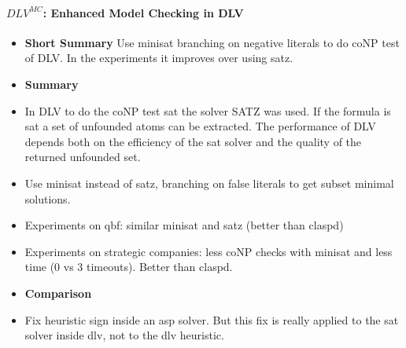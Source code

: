 \paragraph{$DLV^{MC}$: Enhanced Model Checking in DLV \cite{marive10a}}
\begin{itemize}
	\item \textbf{Short Summary}
	      Use minisat branching on negative literals to do coNP test of DLV. 
	      In the experiments it improves over using satz.
	\item \textbf{Summary}
	\item In DLV to do the coNP test sat the solver SATZ was used. If the formula is sat 
	      a  set of unfounded atoms can be extracted. The performance of DLV depends
	      both on the efficiency of the sat solver and the quality of the returned unfounded set.
	\item Use minisat instead of satz, branching on false literals to get subset minimal solutions.
	\item Experiments on qbf: similar minisat and satz (better than claspd)
	\item Experiments on strategic companies: less coNP checks with minisat and less time (0 vs 3 timeouts).
	      Better than claspd.
	\item \textbf{Comparison}
	\item Fix heuristic sign inside an asp solver. 
	      But this fix is really applied to the sat solver inside dlv, not to the dlv heuristic.
\end{itemize}

